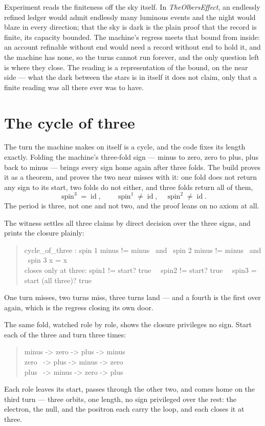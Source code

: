Experiment reads the finiteness off the sky itself.
In \emph{TheOlbersEffect}, an endlessly refined ledger would admit endlessly many luminous events and the night would
blaze in every direction; that the sky is dark is the plain proof that the record is finite, its capacity bounded.
The machine's regress meets that bound from inside: an account refinable without end would need a record without end to
hold it, and the machine has none, so the turns cannot run forever, and the only question left is where they close.
The reading is a representation of the bound, on the near side --- what the dark between the stars is in itself it does
not claim, only that a finite reading was all there ever was to have.

\section{The cycle of three}

The turn the machine makes on itself is a cycle, and the code fixes its length exactly.
Folding the machine's three-fold sign --- minus to zero, zero to plus, plus back to minus --- brings every
sign home again after three folds.
The build proves it as a theorem, and proves the two near misses with it: one fold does not return any sign to its
start, two folds do not either, and three folds return all of them,
\[
  \operatorname{spin}^{3} = \operatorname{id}, \qquad
  \operatorname{spin}^{1} \neq \operatorname{id}, \quad \operatorname{spin}^{2} \neq \operatorname{id} .
\]
The period is three, not one and not two, and the proof leans on no axiom at all.

The witness settles all three claims by direct decision over the three signs, and prints the closure plainly:
\begin{quote}\ttfamily
cycle\_of\_three : spin 1 minus != minus \ and \ spin 2 minus != minus \ and \ spin 3 x = x\\
closes only at three:  spin1 != start? true \ \ spin2 != start? true \ \ spin3 = start (all three)? true
\end{quote}
One turn misses, two turns miss, three turns land --- and a fourth is the first over again, which is the regress closing
its own door.

The same fold, watched role by role, shows the closure privileges no sign.
Start each of the three and turn three times:
\begin{quote}\ttfamily
minus -> zero -> plus -> minus\\
zero \ -> plus -> minus -> zero\\
plus \ -> minus -> zero -> plus
\end{quote}
Each role leaves its start, passes through the other two, and comes home on the third turn --- three orbits, one length,
no sign privileged over the rest: the electron, the null, and the positron each carry the loop, and each closes it at
three.


